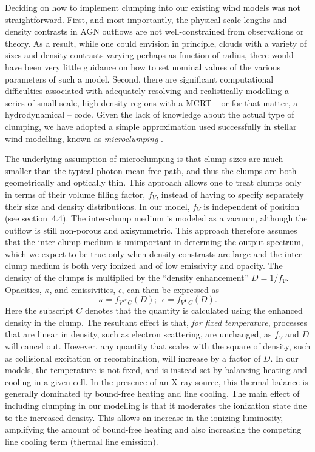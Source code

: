 \documentclass[useAMS,usenatbib]{mn2e_x}
\begin{document}
Deciding on how to implement clumping into our existing wind models was not straightforward.
First, and most importantly, the physical scale lengths and density contrasts in AGN outflows are not well-constrained from observations or theory.  As a result, while one could envision in principle, clouds with a variety of sizes and density contrasts varying perhaps as function of radius, there would have been very little guidance on how to set nominal values of the various parameters of such a model.
Second, there are significant computational difficulties associated with adequately resolving and realistically modelling a series of small scale, high density regions with a MCRT
-- or for that matter, a hydrodynamical -- code. 
Given the lack of knowledge about the actual type of clumping, we have adopted
a simple approximation used successfully in stellar wind modelling, known as 
{\em microclumping} \citep[e.g.][]{hamann1998,hilliermiller1999,hamann2008}.  

The underlying assumption of microclumping is that clump sizes are much smaller than the 
typical photon mean free path, and thus the clumps are 
both geometrically and optically thin. This approach 
allows one to treat clumps only in terms of their volume filling factor, $f_V$, 
instead of having to specify separately their size and density distributions.
In our model, $f_V$ is independent of position (see section~4.4).
The inter-clump medium is modeled as a vacuum,
although the outflow is still non-porous and axisymmetric.
This approach therefore assumes that the inter-clump medium
is unimportant in determing the output spectrum, which
we expect to be true only when density constrasts are large and
the inter-clump medium is both very ionized and of low emissivity and opacity.
The density of the clumps is multiplied by the ``density enhancement'' 
$D=1/f_V$. Opacities, $\kappa$, and emissivities, $\epsilon$, 
can then be expressed as 
\begin{equation}
\kappa = f_V \kappa_C(D);~~\epsilon = f_V \epsilon_C(D).
\end{equation}
Here the subscript $C$ denotes that the quantity is calculated using the 
enhanced density in the clump. The resultant effect is that, {\em for fixed temperature},
processes that are linear in density, such as electron scattering, are unchanged, 
as $f_V$ and $D$ will cancel out. However, any quantity that scales with the square of density, 
such as collisional excitation or recombination, will increase by a factor of $D$.
In our models, the temperature is not fixed, and is instead set by balancing heating and 
cooling in a given cell. In the presence of an X-ray source, this thermal balance is 
generally dominated by bound-free heating and line cooling. The main effect of including 
clumping in our modelling is that it moderates the ionization state due to the increased 
density. This allows an increase in the ionizing luminosity, amplifying the amount of
bound-free heating and also increasing the competing line cooling term
(thermal line emission).
\end{document}
